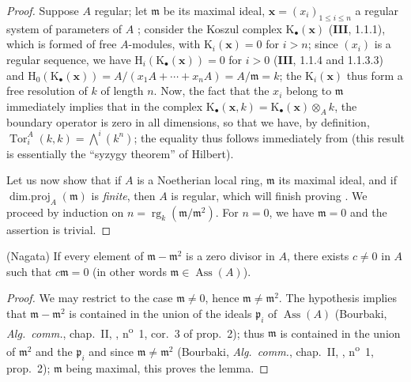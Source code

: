 \begin{proof}
Suppose $A$ regular;
let $\mathfrak{m}$ be its maximal ideal, $\mathbf{x}=(x_i)_{1\leq i\leq n}$ a regular system of parameters of $A$ ;
consider the Koszul complex $\mathrm{K}_\bullet(\mathbf{x})$ (\textbf{III}, 1.1.1), which is formed of free $A$-modules, with $\mathrm{K}_i(\mathbf{x})=0$ for $i>n$;
since $(x_i)$ is a regular sequence, we have $\mathrm{H}_i(\mathrm{K}_\bullet(\mathbf{x}))=0$ for $i>0$ (\textbf{III}, 1.1.4 and 1.1.3.3) and $\mathrm{H}_0(\mathrm{K}_\bullet(\mathbf{x}))=A/(x_1 A+\cdots+x_n A)=A/\mathfrak{m}=k$;
the $\mathrm{K}_i(\mathbf{x})$ thus form a free resolution of $k$ of length $n$.
Now, the fact that the $x_i$ belong to $\mathfrak{m}$ immediately implies that in the complex $\mathrm{K}_\bullet(\mathbf{x},k)=\mathrm{K}_\bullet(\mathbf{x})\otimes_A k$, the boundary operator is zero in all dimensions, so that we have, by definition, $\operatorname{Tor}^A_i(k,k)=\textstyle\bigwedge^i(k^n)$;
the equality  thus follows immediately from  (this result is essentially the ``syzygy theorem'' of Hilbert).

Let us now show that if $A$ is a Noetherian local ring, $\mathfrak{m}$ its maximal ideal, and if $\operatorname{dim.proj}_A(\mathfrak{m})$ is \emph{finite}, then $A$ is regular, which will finish proving .
We proceed by induction on $n=\operatorname{rg}_k(\mathfrak{m}/\mathfrak{m}^2)$.
For $n=0$, we have $\mathfrak{m}=0$ and the assertion is trivial.
\end{proof}

\begin{lemma}[17.3.1.2]
\label{0.17.3.1.2}
\textnormal{(Nagata)}
If every element of $\mathfrak{m}-\mathfrak{m}^2$ is a zero divisor in $A$, there exists $c\neq 0$ in $A$ such that $c\mathfrak{m}=0$ (in other words $\mathfrak{m}\in\operatorname{Ass}(A)$).
\end{lemma}

\begin{proof}
We may restrict to the case $\mathfrak{m}\neq 0$, hence $\mathfrak{m}\neq\mathfrak{m}^2$.
The hypothesis implies that $\mathfrak{m}-\mathfrak{m}^2$ is contained in the union of the ideals $\mathfrak{p}_i$ of $\operatorname{Ass}(A)$ (Bourbaki, \emph{Alg.~comm.}, chap.~II, , n\textsuperscript{o}~1, cor.~3 of prop.~2);
thus $\mathfrak{m}$ is contained in the union of $\mathfrak{m}^2$ and the $\mathfrak{p}_i$ and since $\mathfrak{m}\neq\mathfrak{m}^2$ (Bourbaki, \emph{Alg.~comm.}, chap.~II, , n\textsuperscript{o}~1, prop.~2);
$\mathfrak{m}$ being maximal, this proves the lemma.
\end{proof}

